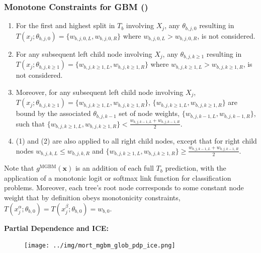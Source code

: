 \documentclass[11pt,aspectratio=169,hyperref={colorlinks}]{beamer}
\begin{document}
	\begin{frame}
	
	\frametitle{Monotone Constraints for GBM (\cite{rml_workflow})}
	
		\begin{enumerate}\scriptsize
			\item For the first and highest split in $T_b$ involving $X_j$, any $\theta_{b,j,0}$ resulting in $T(x_j; \theta_{b,j,0}) = \{w_{b,j,0,L}, w_{b,j,0,R}\}$ where $w_{b,j,0,L} > w_{b,j,0,R}$, is not considered. 
			\item For any subsequent left child node involving $X_j$, any $\theta_{b,j, k\ge1}$ resulting in $T(x_j; \theta_{b,j,k\ge1}) = \{w_{b,j,k\ge1,L}, w_{b,j,k\ge1,R}\}$ where $w_{b,j,k\ge1,L} > w_{b,j,k\ge1,R}$, is not considered.
			\item Moreover, for any subsequent left child node involving $X_j$, $T(x_j; \theta_{b,j,k\ge1}) = \{w_{b,j,k\ge1,L}, w_{b,j,k\ge1,R}\}$, $\{w_{b,j,k\ge1,L}, w_{b,j,k\ge1,R}\}$ are bound by the associated $\theta_{b,j,k-1}$ set of node weights, $\{w_{b,j,k-1,L}, w_{b,j,k-1, R}\}$, such that $ \{w_{b,j,k\ge1,L}, w_{b,j,k\ge1,R}\} < \frac{w_{b,j,k-1,L} + w_{b,j,k-1,R}}{2}$.
			\item (1) and (2) are also applied to all right child nodes, except that for right child nodes $ w_{b,j,k,L} \le w_{b,j,k,R}$ and $\{w_{b,j,k\ge1,L}, w_{b,j,k\ge1,R}\} \ge \frac{w_{b,j,k-1,L} + w_{b,j,k-1,R}}{2}$.
		\end{enumerate}
	
	Note that $g^{\text{MGBM}}(\mathbf{x})$ is an addition of each full $T_b$ prediction, with the application of a monotonic logit or softmax link function for classification problems. Moreover, each tree's root node corresponds to some constant node weight that by definition obeys monotonicity constraints, $ T(x^{\alpha}_j; \theta_{b,0}) = T(x^{\beta}_j; \theta_{b,0}) = w_{b,0}$. 
	
	\end{frame}

	\begin{frame}
	
			\textbf{Partial Dependence and ICE:}

			\begin{figure}[htb]
				\begin{center}
					\texttt{[image: ../img/mort\_mgbm\_glob\_pdp\_ice.png]}
					\label{fig:mgbm}
				\end{center}
			\end{figure}
	
	\end{frame}
\end{document}
